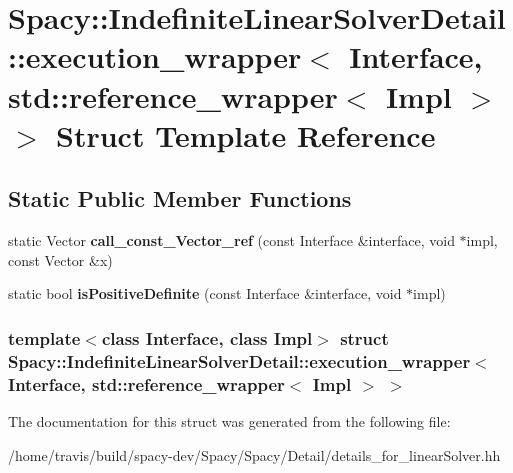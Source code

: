 \hypertarget{structSpacy_1_1IndefiniteLinearSolverDetail_1_1execution__wrapper_3_01Interface_00_01std_1_1refe4cba524893aa44081bdb4ac130342c19}{\section{\-Spacy\-:\-:\-Indefinite\-Linear\-Solver\-Detail\-:\-:execution\-\_\-wrapper$<$ \-Interface, std\-:\-:reference\-\_\-wrapper$<$ \-Impl $>$ $>$ \-Struct \-Template \-Reference}
\label{structSpacy_1_1IndefiniteLinearSolverDetail_1_1execution__wrapper_3_01Interface_00_01std_1_1refe4cba524893aa44081bdb4ac130342c19}
}
\subsection*{\-Static \-Public \-Member \-Functions}
\begin{DoxyCompactItemize}
\item 
\hypertarget{structSpacy_1_1IndefiniteLinearSolverDetail_1_1execution__wrapper_3_01Interface_00_01std_1_1refe4cba524893aa44081bdb4ac130342c19_a6733e374fb920368edf3b4494cc04570}{static \-Vector {\bfseries call\-\_\-const\-\_\-\-Vector\-\_\-ref} (const \-Interface \&interface, void $\ast$impl, const \-Vector \&x)}\label{structSpacy_1_1IndefiniteLinearSolverDetail_1_1execution__wrapper_3_01Interface_00_01std_1_1refe4cba524893aa44081bdb4ac130342c19_a6733e374fb920368edf3b4494cc04570}

\item 
\hypertarget{structSpacy_1_1IndefiniteLinearSolverDetail_1_1execution__wrapper_3_01Interface_00_01std_1_1refe4cba524893aa44081bdb4ac130342c19_ae5c8f90ae593fa4cd809d8eeae9485aa}{static bool {\bfseries is\-Positive\-Definite} (const \-Interface \&interface, void $\ast$impl)}\label{structSpacy_1_1IndefiniteLinearSolverDetail_1_1execution__wrapper_3_01Interface_00_01std_1_1refe4cba524893aa44081bdb4ac130342c19_ae5c8f90ae593fa4cd809d8eeae9485aa}

\end{DoxyCompactItemize}
\subsubsection*{template$<$class Interface, class Impl$>$ struct Spacy\-::\-Indefinite\-Linear\-Solver\-Detail\-::execution\-\_\-wrapper$<$ Interface, std\-::reference\-\_\-wrapper$<$ Impl $>$ $>$}



\-The documentation for this struct was generated from the following file\-:\begin{DoxyCompactItemize}
\item 
/home/travis/build/spacy-\/dev/\-Spacy/\-Spacy/\-Detail/details\-\_\-for\-\_\-linear\-Solver.\-hh\end{DoxyCompactItemize}
